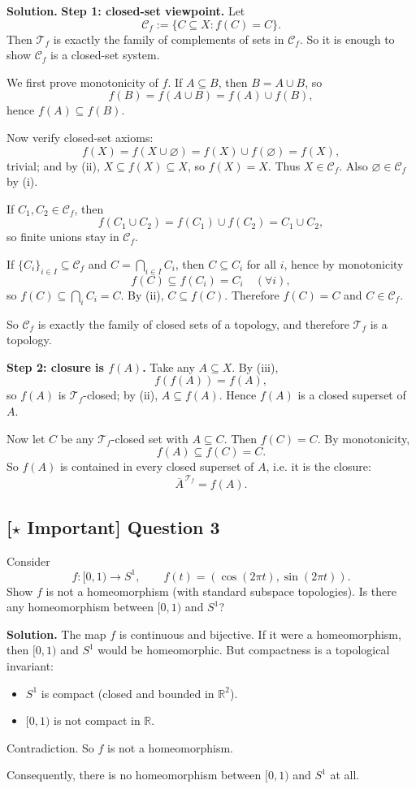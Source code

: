 \documentclass{article}
\newcommand{\R}{\mathbb{R}}
\newcommand{\important}{\texorpdfstring{\textbf{[\(\star\) Important]}}{[Important]}}
\newenvironment{solution}{\par\noindent\textbf{Solution.}\quad}{\par}
\begin{document}
\begin{solution}
\textbf{Step 1: closed-set viewpoint.}
Let
\[
\mathcal C_f:=\{C\subseteq X:f(C)=C\}.
\]
Then $\mathcal{T}_f$ is exactly the family of complements of sets in $\mathcal C_f$.
So it is enough to show $\mathcal C_f$ is a closed-set system.

We first prove monotonicity of $f$.
If $A\subseteq B$, then $B=A\cup B$, so
\[
f(B)=f(A\cup B)=f(A)\cup f(B),
\]
hence $f(A)\subseteq f(B)$.

Now verify closed-set axioms:
\[
f(X)=f(X\cup\varnothing)=f(X)\cup f(\varnothing)=f(X),
\]
trivial; and by (ii), $X\subseteq f(X)\subseteq X$, so $f(X)=X$. Thus $X\in\mathcal C_f$.
Also $\varnothing\in\mathcal C_f$ by (i).

If $C_1,C_2\in\mathcal C_f$, then
\[
f(C_1\cup C_2)=f(C_1)\cup f(C_2)=C_1\cup C_2,
\]
so finite unions stay in $\mathcal C_f$.

If $\{C_i\}_{i\in I}\subseteq\mathcal C_f$ and $C=\bigcap_{i\in I}C_i$, then $C\subseteq C_i$ for all $i$, hence by monotonicity
\[
f(C)\subseteq f(C_i)=C_i\quad(\forall i),
\]
so $f(C)\subseteq\bigcap_i C_i=C$. By (ii), $C\subseteq f(C)$. Therefore $f(C)=C$ and $C\in\mathcal C_f$.

So $\mathcal C_f$ is exactly the family of closed sets of a topology, and therefore $\mathcal{T}_f$ is a topology.

\textbf{Step 2: closure is $f(A)$.}
Take any $A\subseteq X$.
By (iii),
\[
f(f(A))=f(A),
\]
so $f(A)$ is $\mathcal{T}_f$-closed; by (ii), $A\subseteq f(A)$.
Hence $f(A)$ is a closed superset of $A$.

Now let $C$ be any $\mathcal{T}_f$-closed set with $A\subseteq C$.
Then $f(C)=C$. By monotonicity,
\[
f(A)\subseteq f(C)=C.
\]
So $f(A)$ is contained in every closed superset of $A$, i.e. it is the closure:
\[
\overline A^{\,\mathcal{T}_f}=f(A).
\]
\end{solution}

\subsection{\important{} Question 3}

Consider
\[
f:[0,1)\to S^1,\qquad f(t)=(\cos(2\pi t),\sin(2\pi t)).
\]
Show $f$ is not a homeomorphism (with standard subspace topologies). Is there any homeomorphism between $[0,1)$ and $S^1$?

\begin{solution}
The map $f$ is continuous and bijective.
If it were a homeomorphism, then $[0,1)$ and $S^1$ would be homeomorphic.
But compactness is a topological invariant:
\begin{itemize}
\item $S^1$ is compact (closed and bounded in $\R^2$).
\item $[0,1)$ is not compact in $\R$.
\end{itemize}
Contradiction. So $f$ is not a homeomorphism.

Consequently, there is no homeomorphism between $[0,1)$ and $S^1$ at all.
\end{solution}
\end{document}
